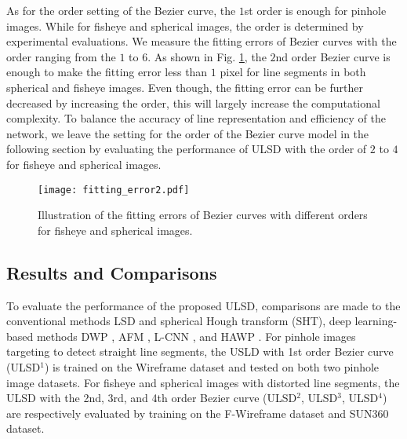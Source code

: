 \documentclass[letterpaper, 10 pt, conference]{ieeeconf}
\begin{document}
As for the order setting of the Bezier curve, the $1$st order is enough for pinhole images. While for fisheye and spherical images, the order is determined by experimental evaluations. We measure the fitting errors of Bezier curves with the order ranging from the $1$ to $6$. As shown in Fig. \ref{fig:4}, the $2$nd order Bezier curve is enough to make the fitting error less than $1$ pixel for line segments in both spherical and fisheye images. Even though, the fitting error can be further decreased by increasing the order, this will largely increase the computational complexity. To balance the accuracy of line representation and efficiency of the network, we leave the setting for the order of the Bezier curve model in the following section by evaluating the performance of ULSD with the order of $2$ to $4$ for fisheye and spherical images.

\begin{figure}[t]
	\begin{center}
		\texttt{[image: fitting\_error2.pdf]}
	\end{center}
	\caption{Illustration of the fitting errors of Bezier curves with different orders for fisheye and spherical images.}
	\label{fig:4}
\end{figure}

\subsection{Results and Comparisons} \label{sec4-3} 
To evaluate the performance of the proposed ULSD, comparisons are made to the conventional methods LSD \cite{LSD} and spherical Hough transform (SHT), deep learning-based methods DWP \cite{DWP}, AFM \cite{AFM}, L-CNN \cite{LCNN}, and HAWP \cite{HAWP}. For pinhole images targeting to detect straight line segments, the USLD with 1st order Bezier curve (ULSD$^1$) is trained on the Wireframe dataset and tested on both two pinhole image datasets. For fisheye and spherical images with distorted line segments, the ULSD with the 2nd, 3rd, and 4th order Bezier curve (ULSD$^2$, ULSD$^3$, ULSD$^4$) are respectively evaluated by training on the F-Wireframe dataset and SUN360 dataset.
\end{document}
